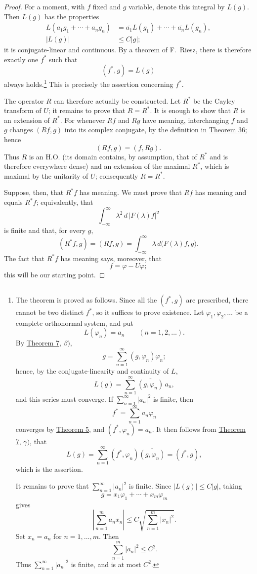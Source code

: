 ﻿\documentclass[paper=b5,fontsize=13pt,bookmarkpackage=false,twoside]{scrartcl}
\begin{document}
\begin{proof}
For a moment, with $f$ fixed and $g$ variable, denote this integral by $L(g)$. Then $L(g)$ has the properties
\begin{align*}
L(a_1g_1+\cdots+a_ng_n)
&=\overline{a_1}L(g_1)+\cdots+\overline{a_n}L(g_n),\\
|L(g)|&\le C|g|;
\end{align*}
it is conjugate-linear and continuous. By a theorem of F.~Riesz, there is therefore exactly one $f^*$ such that
\[
(f^*,g)=L(g)
\]
always holds.\footnote{\label{fn:52}The theorem is proved as follows. Since all the $(f^*,g)$ are prescribed, there cannot be two distinct $f^*$, so it suffices to prove existence. Let $\varphi_1,\varphi_2,\ldots$ be a complete orthonormal system, and put
\[
L(\varphi_n)=a_n
\qquad(n=1,2,\ldots).
\]
By \hyperref[thm:7]{Theorem 7}, $\beta)$,
\[
g=\sum_{n=1}^{\infty}(g,\varphi_n)\varphi_n;
\]
hence, by the conjugate-linearity and continuity of $L$,
\[
L(g)=\sum_{n=1}^{\infty}\overline{(g,\varphi_n)}\,a_n,
\]
and this series must converge. If $\sum_{n=1}^{\infty}|a_n|^2$ is finite, then
\[
f^*=\sum_{n=1}^{\infty}a_n\varphi_n
\]
converges by \hyperref[thm:5]{Theorem 5}, and $(f^*,\varphi_n)=a_n$. It then follows from \hyperref[thm:7]{Theorem 7}, $\gamma)$, that
\[
L(g)
=\sum_{n=1}^{\infty}(f^*,\varphi_n)\overline{(g,\varphi_n)}
=(f^*,g),
\]
which is the assertion.

It remains to prove that $\sum_{n=1}^{\infty}|a_n|^2$ is finite. Since $|L(g)|\le C|g|$, taking
\[
g=x_1\varphi_1+\cdots+x_m\varphi_m
\]
gives
\[
\left|\sum_{n=1}^{m}a_n\overline{x_n}\right|
\le C\sqrt{\sum_{n=1}^{m}|x_n|^2}.
\]
Set $x_n=a_n$ for $n=1,\ldots,m$. Then
\[
\sum_{n=1}^{m}|a_n|^2\le C^2.
\]
Thus $\sum_{n=1}^{\infty}|a_n|^2$ is finite, and is at most $C^2$.}
This is precisely the assertion concerning $f^*$.

The operator $R$ can therefore actually be constructed. Let $R^*$ be the Cayley transform of $U$; it remains to prove that $R=R^*$. It is enough to show that $R$ is an extension of $R^*$. For whenever $Rf$ and $Rg$ have meaning, interchanging $f$ and $g$ changes $(Rf,g)$ into its complex conjugate, by the definition in \hyperref[thm:36]{Theorem 36}; hence
\[
(Rf,g)=(f,Rg).
\]
Thus $R$ is an H.O. (its domain contains, by assumption, that of $R^*$ and is therefore everywhere dense) and an extension of the maximal $R^*$, which is maximal by the unitarity of $U$; consequently $R=R^*$.

Suppose, then, that $R^*f$ has meaning. We must prove that $Rf$ has meaning and equals $R^*f$; equivalently, that
\[
\int_{-\infty}^{\infty}\lambda^2\,d\,|F(\lambda)f|^2
\]
is finite and that, for every $g$,
\[
(R^*f,g)=(Rf,g)
=\int_{-\infty}^{\infty}\lambda\,d\bigl(F(\lambda)f,g\bigr).
\]
The fact that $R^*f$ has meaning says, moreover, that
\[
f=\varphi-U\varphi;
\]
this will be our starting point.


\end{proof}
\end{document}
